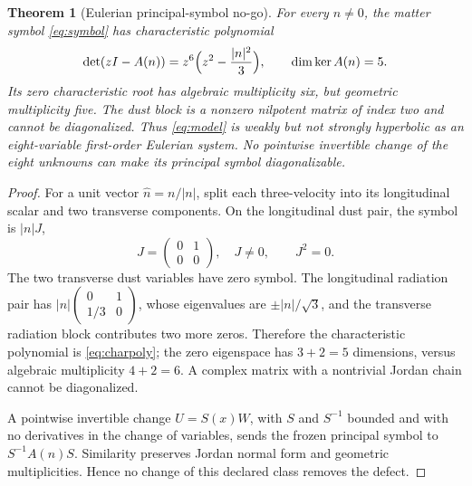 \documentclass[11pt,a4paper]{article}
\newtheorem{theorem}{Theorem}
\begin{document}
\begin{theorem}[Eulerian principal-symbol no-go]\label{thm:jordan}
For every $n\ne0$, the matter symbol \eqref{eq:symbol}
has characteristic polynomial
\begin{equation}\label{eq:charpoly}
\det(zI-A(n))=z^6\Bigl(z^2-\frac{|n|^2}{3}\Bigr),
\qquad \dim\ker A(n)=5.
\end{equation}
Its zero characteristic root has algebraic multiplicity six,
but geometric multiplicity five. The dust block is a
nonzero nilpotent matrix of index two and cannot be
diagonalized. Thus \eqref{eq:model} is weakly but not
strongly hyperbolic as an eight-variable first-order
Eulerian system. No pointwise invertible change of the
eight unknowns can make its principal symbol diagonalizable.
\end{theorem}
\begin{proof}
For a unit vector $\hat n=n/|n|$, split each
three-velocity into its longitudinal scalar and
two transverse components. On the longitudinal dust
pair, the symbol is $|n|J$,
\[
J=\begin{pmatrix}0&1\\0&0\end{pmatrix},
\quad J\ne0,\qquad J^2=0.
\]
The two transverse dust variables have zero symbol.
The longitudinal radiation pair has
$|n|\left(\begin{smallmatrix}0&1\\1/3&0\end{smallmatrix}\right)$,
whose eigenvalues are $\pm |n|/\sqrt3$,
and the transverse radiation block contributes two more
zeros. Therefore the characteristic polynomial is
\eqref{eq:charpoly}; the zero eigenspace has
$3+2=5$ dimensions, versus algebraic multiplicity
$4+2=6$. A complex matrix with a nontrivial Jordan
chain cannot be diagonalized.

A pointwise invertible change $U=S(x)W$, with
$S$ and $S^{-1}$ bounded and with no derivatives in
the change of variables, sends the frozen principal
symbol to $S^{-1}A(n)S$. Similarity preserves
Jordan normal form and geometric multiplicities.
Hence no change of this declared class removes
the defect.
\end{proof}
\end{document}
